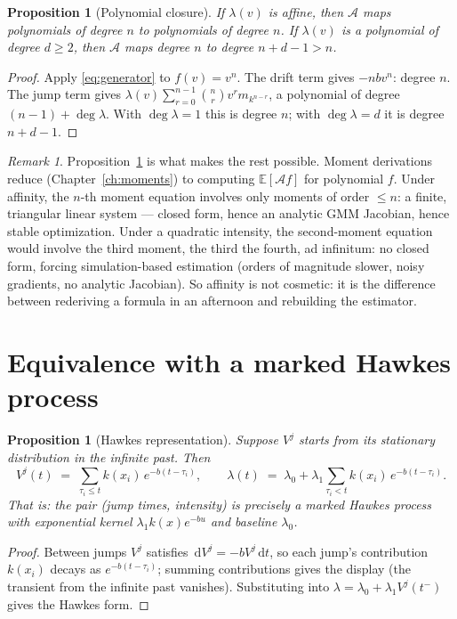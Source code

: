 \documentclass[11pt]{report}
\newtheorem{proposition}[theorem]{Proposition}
\theoremstyle{definition}
\theoremstyle{remark}
\newtheorem{impact}[theorem]{Remark}
\newcommand{\E}{\mathbb{E}}
\newcommand{\A}{\mathcal{A}}
\newcommand{\dd}{\,\mathrm{d}}
\newcommand{\Vj}{V^{j}}
\begin{document}
\begin{proposition}[Polynomial closure]\label{prop:closure}
If $\lambda(v)$ is affine, then $\A$ maps polynomials of degree $n$ to
polynomials of degree $n$. If $\lambda(v)$ is a polynomial of degree
$d\ge 2$, then $\A$ maps degree $n$ to degree $n+d-1 > n$.
\end{proposition}

\begin{proof}
Apply \eqref{eq:generator} to $f(v)=v^{n}$. The drift term gives $-nbv^{n}$:
degree $n$. The jump term gives
$\lambda(v)\sum_{r=0}^{n-1}\binom{n}{r}v^{r}m_{k^{n-r}}$, a polynomial of
degree $(n-1)+\deg\lambda$. With $\deg\lambda=1$ this is degree $n$; with
$\deg\lambda=d$ it is degree $n+d-1$.
\end{proof}

\begin{impact}
Proposition~\ref{prop:closure} is what makes the rest possible. Moment
derivations reduce (Chapter~\ref{ch:moments}) to computing $\E[\A f]$ for
polynomial $f$. Under affinity, the $n$-th moment equation involves only
moments of order $\le n$: a finite, triangular linear system --- closed
form, hence an analytic GMM Jacobian, hence stable optimization. Under a
quadratic intensity, the second-moment equation would involve the third
moment, the third the fourth, ad infinitum: no closed form, forcing
simulation-based estimation (orders of magnitude slower, noisy gradients,
no analytic Jacobian). So affinity is not cosmetic: it is the difference
between rederiving a formula in an afternoon and rebuilding the estimator.
\end{impact}

\section{Equivalence with a marked Hawkes process}

\begin{proposition}[Hawkes representation]\label{prop:hawkes}
Suppose $\Vj$ starts from its stationary distribution in the infinite past.
Then
\[
\Vj(t)\;=\;\sum_{\tau_i\le t} k(x_i)\,e^{-b(t-\tau_i)},
\qquad
\lambda(t)\;=\;\lambda_{0}+\lambda_{1}\!\!\sum_{\tau_i< t} k(x_i)\,e^{-b(t-\tau_i)} .
\]
That is: the pair (jump times, intensity) is precisely a \emph{marked Hawkes
process with exponential kernel} $\lambda_{1}k(x)e^{-bu}$ and baseline
$\lambda_{0}$.
\end{proposition}

\begin{proof}
Between jumps $\Vj$ satisfies $\dd\Vj=-b\Vj\dd t$, so each jump's
contribution $k(x_i)$ decays as $e^{-b(t-\tau_i)}$; summing contributions
gives the display (the transient from the infinite past vanishes).
Substituting into $\lambda=\lambda_0+\lambda_1\Vj(t^-)$ gives the Hawkes
form.
\end{proof}
\end{document}
